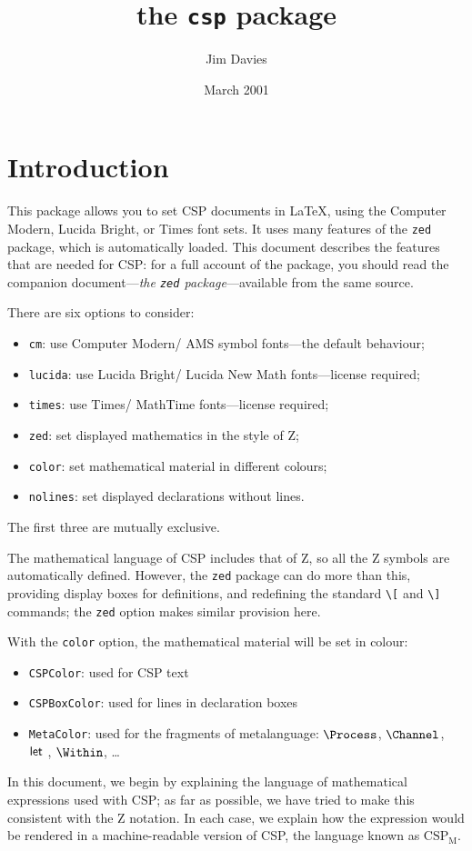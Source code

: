 \documentclass[fleqn,a4paper]{article}
\begin{document}
\title{the \texttt{csp} package}

\author{Jim Davies}

\date{March 2001}

\maketitle

\section{Introduction}

This package allows you to set CSP documents in \LaTeX, using the
Computer Modern, Lucida Bright, or Times font sets.  It uses many
features of the \texttt{zed} package, which is automatically loaded.
This document describes the features that are needed for CSP: for a
full account of the package, you should read the companion
document---\textsl{the \texttt{zed} package}---available from the same
source.

There are six options to consider:
\begin{itemize}
\item \texttt{cm}: use Computer Modern/ AMS symbol fonts---the default
  behaviour;
\item \texttt{lucida}: use Lucida Bright/ Lucida New Math
  fonts---license required;
\item \texttt{times}: use Times/ MathTime fonts---license required;
\item \texttt{zed}: set displayed mathematics in the style of Z;
\item \texttt{color}: set mathematical material in different colours;
\item \texttt{nolines}: set displayed declarations without lines.
\end{itemize}
The first three are mutually exclusive.

The mathematical language of CSP includes that of Z, so all the Z
symbols are automatically defined.  However, the \texttt{zed} package
can do more than this, providing display boxes for definitions, and
redefining the standard \verb=\[= and \verb=\]= commands; the
\texttt{zed} option makes similar provision here.

With the \verb=color= option, the mathematical material will be set in
colour:
\begin{itemize}
\item \texttt{CSPColor}: used for CSP text
\item \texttt{CSPBoxColor}: used for lines in declaration boxes
\item \texttt{MetaColor}: used for the fragments of metalanguage:
  $\Process$, $\Channel$, $\mathop{{\mathsf{let}~}}$, $\Within$, \ldots
\end{itemize}
In this document, we begin by explaining the language of mathematical
expressions used with CSP; as far as possible, we have tried to make
this consistent with the Z notation.  In each case, we explain how the
expression would be rendered in a machine-readable version of CSP, the
language known as $\mathrm{CSP_M}$.
\end{document}
